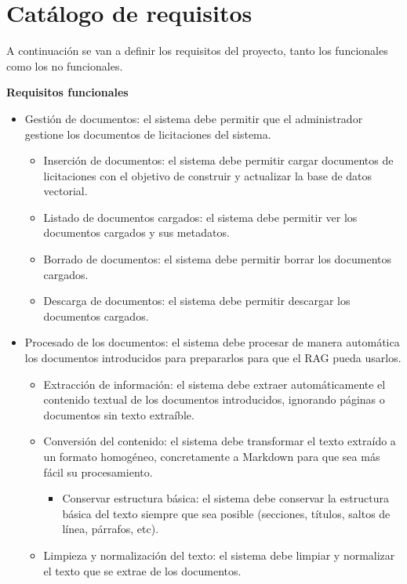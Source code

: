\section{Catálogo de requisitos} \label{req:req}

A continuación se van a definir los requisitos del proyecto, tanto los funcionales como los no funcionales.

\textbf{Requisitos funcionales}

\begin{itemize}
\tightlist
	\item {} Gestión de documentos: el sistema debe permitir que el administrador gestione los documentos de licitaciones del sistema. 
	\begin{itemize}
	\tightlist
		\item {} Inserción de documentos: el sistema debe permitir cargar documentos de licitaciones con el objetivo de construir y actualizar la base de datos vectorial.
		\item {} Listado de documentos cargados: el sistema debe permitir ver los documentos cargados y sus metadatos.
		\item {} Borrado de documentos: el sistema debe permitir borrar los documentos cargados.
		\item {} Descarga de documentos: el sistema debe permitir descargar los documentos cargados.
	\end{itemize}
	\item {} Procesado de los documentos: el sistema debe procesar de manera automática los documentos introducidos para prepararlos para que el RAG pueda usarlos.
	\begin{itemize}
	\tightlist
		\item {} Extracción de información: el sistema debe extraer automáticamente el contenido textual de los documentos introducidos, ignorando páginas o documentos sin texto extraíble.
		\item {} Conversión del contenido: el sistema debe transformar el texto extraído a un formato homogéneo, concretamente a Markdown para que sea más fácil su procesamiento.
		\begin{itemize}
		\tightlist
			\item {} Conservar estructura básica: el sistema debe conservar la estructura básica del texto siempre que sea posible (secciones, títulos, saltos de línea, párrafos, etc).
		\end{itemize}
		\item {} Limpieza y normalización del texto: el sistema debe limpiar y normalizar el texto que se extrae de los documentos.

\end{itemize}
\end{itemize}
